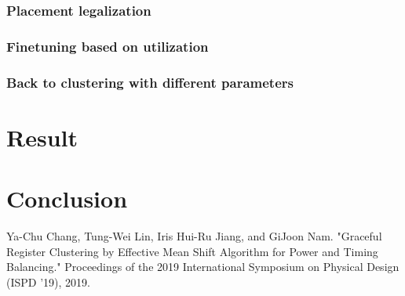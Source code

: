 \documentclass[12pt]{article}
\begin{document}
\subsubsection{Placement legalization}

\subsubsection{Finetuning based on utilization}

\subsubsection{Back to clustering with different parameters}

\section{Result}

\section{Conclusion}

\begin{thebibliography}{9}
    Ya-Chu Chang, Tung-Wei Lin, Iris Hui-Ru Jiang, and GiJoon Nam. "Graceful Register Clustering by Effective Mean Shift Algorithm for Power and Timing Balancing." Proceedings of the 2019 International Symposium on Physical Design (ISPD '19), 2019.
\end{thebibliography}
\end{document}

